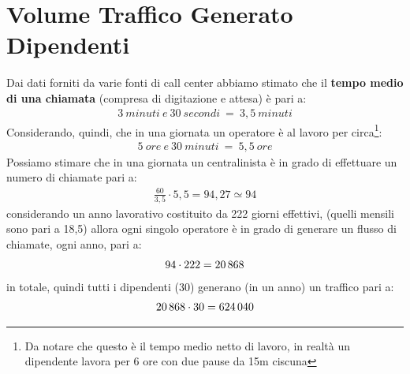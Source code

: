 \section[Volume Traffico Generato Dipendenti]{Volume Traffico Generato Dipendenti}
Dai dati forniti da varie fonti di call center abbiamo stimato che il \textbf{tempo medio di una chiamata} (compresa di digitazione e attesa) è pari a:
	\begin{equation}
	\label{eq:durata_media_chiamate}
	\begin{split}
		3 \: minuti \: e \: 30 \: secondi \: = \: 3,5 \: minuti  
	\end{split}
	\end{equation}
Considerando, quindi, che in una giornata un operatore è al lavoro per circa\footnote{Da notare che questo è il tempo medio netto di lavoro, in realtà un dipendente lavora per 6 ore con due pause da 15m ciscuna}:
	\begin{equation}
	\label{eq:durata_orario_lavoro}
	\begin{split}
		5 \: ore \: e \: 30 \: minuti \: = \: 5,5 \: ore  
	\end{split}
	\end{equation}
Possiamo stimare che in una giornata un centralinista è in grado di effettuare un numero di chiamate pari a:
	\begin{equation}
	\label{eq:num_chiamate_singolo_operatore_giorno}
	\begin{split}
		\frac{60}{3,5} \cdot 5,5 = 94,27 \simeq 94 
	\end{split}
	\end{equation}
considerando un anno lavorativo costituito da 222 giorni effettivi, (quelli mensili sono pari a 18,5) allora ogni singolo operatore è in grado di generare un flusso di chiamate, ogni anno, pari a:
	\begin{equation}
	\label{eq:num_chiamate_singolo_operatore_anno}
	\begin{split}
		94 \cdot 222 = 20\thinspace 868 
	\end{split}
	\end{equation}
in totale, quindi tutti i dipendenti (30) generano (in un anno) un traffico pari a:
	\begin{equation}
	\label{eq:num_chiamate_azienda_anno}
	\begin{split}
		20\thinspace 868 \cdot 30 = 624\thinspace 040 
	\end{split}
	\end{equation}
